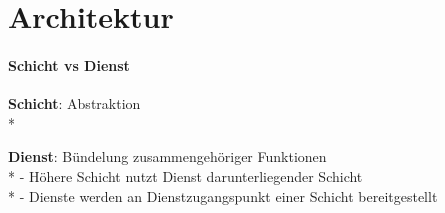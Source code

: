 \section{Architektur}
\paragraph{Schicht vs Dienst}
\begin{items}
	\item \textbf{Schicht}: Abstraktion \\*
	\item \textbf{Dienst}: Bündelung zusammengehöriger Funktionen \\*
	- Höhere Schicht nutzt Dienst darunterliegender Schicht \\*
	- Dienste werden an Dienstzugangspunkt einer Schicht bereitgestellt
\end{items}
